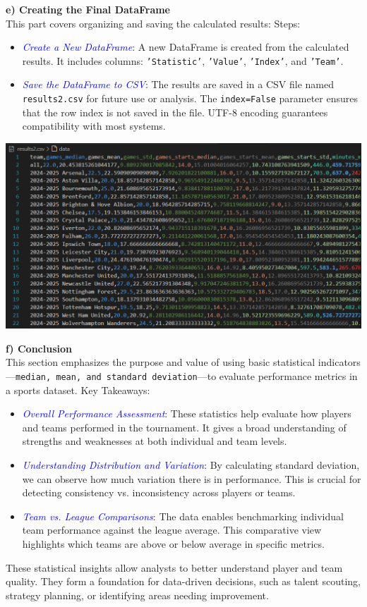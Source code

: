 \documentclass[a4paper,12pt]{article}
\begin{document}
\textbf{e) Creating the Final DataFrame} \\
This part covers organizing and saving the calculated results:
Steps:
\begin{itemize}
     \item \textit{\textcolor{blue}{Create a New DataFrame}}: A new DataFrame is created from the calculated results. It includes columns: \texttt{'Statistic'}, \texttt{'Value'}, \texttt{'Index'}, and \texttt{'Team'}.
     \item \textit{\textcolor{blue}{Save the DataFrame to CSV}}: The results are saved in a CSV file named \texttt{results2.csv} for future use or analysis. The \texttt{index=False} parameter ensures that the row index is not saved in the file. UTF-8 encoding guarantees compatibility with most systems.
\end{itemize}

\includegraphics[width=1\textwidth]{results2.png}

\textbf{f) Conclusion} \\
This section emphasizes the purpose and value of using basic statistical indicators—\texttt{median, mean, and standard deviation}—to evaluate performance metrics in a sports dataset.
Key Takeaways:
\begin{itemize}
    \item \textit{\textcolor{blue}{Overall Performance Assessment}}: These statistics help evaluate how players and teams performed in the tournament. It gives a broad understanding of strengths and weaknesses at both individual and team levels.
    \item \textit{\textcolor{blue}{Understanding Distribution and Variation}}: By calculating standard deviation, we can observe how much variation there is in performance. This is crucial for detecting consistency vs. inconsistency across players or teams.
    \item \textit{\textcolor{blue}{Team vs. League Comparisons}}: The data enables benchmarking individual team performance against the league average. This comparative view highlights which teams are above or below average in specific metrics.
\end{itemize}
These statistical insights allow analysts to better understand player and team quality. They form a foundation for data-driven decisions, such as talent scouting, strategy planning, or identifying areas needing improvement.
\end{document}
